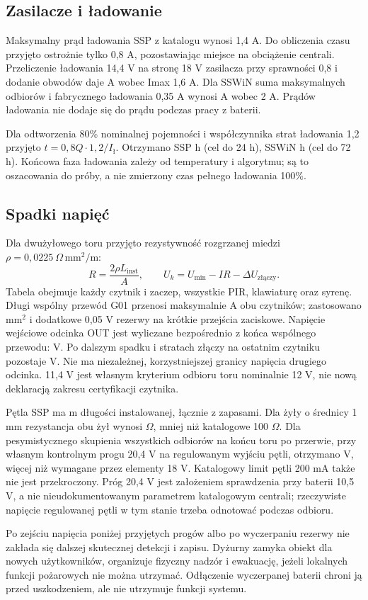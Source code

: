 \subsection{Zasilacze i ładowanie}
Maksymalny prąd ładowania SSP z katalogu wynosi 1,4 A. Do obliczenia czasu przyjęto ostrożnie tylko 0,8 A, pozostawiając miejsce na obciążenie centrali. Przeliczenie ładowania 14,4 V na stronę 18 V zasilacza przy sprawności 0,8 i dodanie obwodów daje \FireSupplyA{} A wobec Imax 1,6 A. Dla SSWiN suma maksymalnych odbiorów i fabrycznego ładowania 0,35 A wynosi \IntrusionSupplyA{} A wobec 2 A. Prądów ładowania nie dodaje się do prądu podczas pracy z baterii.

Dla odtworzenia 80\% nominalnej pojemności i współczynnika strat ładowania 1,2 przyjęto $t=0{,}8Q\cdot1{,}2/I_{\text{ł}}$. Otrzymano SSP \FireRecharge{} h (cel do 24 h), SSWiN \IntrusionRecharge{} h (cel do 72 h). Końcowa faza ładowania zależy od temperatury i algorytmu; są to oszacowania do próby, a nie zmierzony czas pełnego ładowania 100\%.

\subsection{Spadki napięć}
Dla dwużyłowego toru przyjęto rezystywność rozgrzanej miedzi $\rho=0{,}0225\ \Omega\,\mathrm{mm}^2/\mathrm{m}$:
\[
R=\frac{2\rho L_{\mathrm{inst}}}{A},\qquad U_k=U_{\min}-IR-\Delta U_{\text{złączy}}.
\]
Tabela obejmuje każdy czytnik i zaczep, wszystkie PIR, klawiaturę oraz syrenę. Długi wspólny przewód G01 przenosi maksymalnie \GateCurrent{} A obu czytników; zastosowano \GateSection{} mm$^2$ i dodatkowe 0,05 V rezerwy na krótkie przejścia zaciskowe. Napięcie wejściowe odcinka OUT jest wyliczane bezpośrednio z końca wspólnego przewodu: \GateFirstVoltage{} V. Po dalszym spadku i stratach złączy na ostatnim czytniku pozostaje \GateReaderVoltage{} V. Nie ma niezależnej, korzystniejszej granicy napięcia drugiego odcinka. 11,4 V jest własnym kryterium odbioru toru nominalnie 12 V, nie nową deklaracją zakresu certyfikacji czytnika.

\VoltageTable

Pętla SSP ma \LoopLength{} m długości instalowanej, łącznie z zapasami. Dla żyły o średnicy 1 mm rezystancja obu żył wynosi \LoopResistance{} $\Omega$, mniej niż katalogowe 100 $\Omega$. Dla pesymistycznego skupienia wszystkich odbiorów na końcu toru po przerwie, przy własnym kontrolnym progu 20,4 V na regulowanym wyjściu pętli, otrzymano \LoopVoltage{} V, więcej niż wymagane przez elementy 18 V. Katalogowy limit pętli 200 mA także nie jest przekroczony. Próg 20,4 V jest założeniem sprawdzenia przy baterii 10,5 V, a nie nieudokumentowanym parametrem katalogowym centrali; rzeczywiste napięcie regulowanej pętli w tym stanie trzeba odnotować podczas odbioru.

Po zejściu napięcia poniżej przyjętych progów albo po wyczerpaniu rezerwy nie zakłada się dalszej skutecznej detekcji i zapisu. Dyżurny zamyka obiekt dla nowych użytkowników, organizuje fizyczny nadzór i ewakuację, jeżeli lokalnych funkcji pożarowych nie można utrzymać. Odłączenie wyczerpanej baterii chroni ją przed uszkodzeniem, ale nie utrzymuje funkcji systemu.
